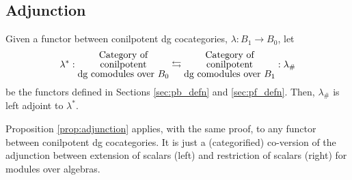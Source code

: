 \subsection{Adjunction}
\begin{prop}\label{prop:adjunction}
Given a functor between 
conilpotent dg cocategories, 
$\lambda: B_1 \to B_0$, let
\begin{equation*}
\lambda^*:
\let\scriptstyle\textstyle
\substack{
  \textrm{Category of}\\
  \textrm{conilpotent}\\
  \textrm{dg comodules over }B_0}
\leftrightarrows
\let\scriptstyle\textstyle
\substack{
  \textrm{Category of}\\
  \textrm{conilpotent}\\
  \textrm{dg comodules over }B_1}
: \lambda_\#
\end{equation*}
be the functors defined in Sections 
\ref{sec:pb_defn} and \ref{sec:pf_defn}. Then,
$\lambda_\#$ is left adjoint to $\lambda^*$.
\end{prop}
%
\begin{rem} \label{rem:adjunction}
Proposition \ref{prop:adjunction} 
applies, with the same proof, 
to any functor between 
conilpotent dg cocategories.
It is just a (categorified) co-version of the 
adjunction between extension of scalars 
(left) and restriction of scalars (right) 
for modules over algebras.
\end{rem}
%
